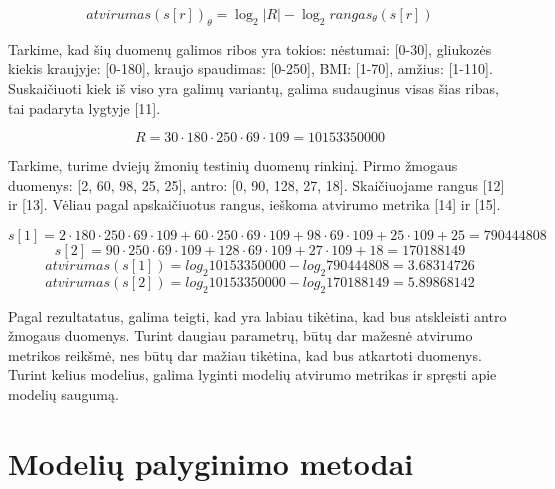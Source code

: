 \documentclass{VUMIFInfBakalaurinis}
\begin{document}
\begin{equation}
atvirumas(s[r])_{\theta} = \log_{2}|R| - \log_{2}rangas_{\theta}(s[r]) 
\end{equation}

\par Tarkime, kad šių duomenų galimos ribos yra tokios: nėstumai: [0-30], gliukozės kiekis kraujyje: [0-180], kraujo spaudimas: [0-250], BMI: [1-70], amžius: [1-110]. Suskaičiuoti kiek iš viso yra galimų variantų, galima sudauginus visas šias ribas, tai padaryta lygtyje [11].

\begin{equation}
R = 30 \cdot 180 \cdot 250 \cdot 69 \cdot 109 = 10153350000
\end{equation}

\par Tarkime, turime dviejų žmonių testinių duomenų rinkinį. Pirmo žmogaus duomenys: [2, 60, 98, 25, 25], antro: [0, 90, 128, 27, 18]. Skaičiuojame rangus [12] ir [13]. Vėliau pagal apskaičiuotus rangus, ieškoma atvirumo metrika [14] ir [15].

\begin{equation}
s[1] = 2 \cdot 180 \cdot 250 \cdot 69 \cdot 109 + 60 \cdot 250 \cdot 69 \cdot 109 + 98 \cdot 69 \cdot 109 + 25 \cdot 109 + 25 = 790444808
\end{equation}
\begin{equation}
s[2] = 90 \cdot 250 \cdot 69 \cdot 109 + 128 \cdot 69 \cdot 109 + 27 \cdot 109 + 18 = 170188149
\end{equation}
\begin{equation}
atvirumas(s[1]) = log_{2} 10153350000 - log_{2} 790444808 = 3.68314726
\end{equation}
\begin{equation}
atvirumas(s[2]) = log_{2} 10153350000 - log_{2} 170188149 = 5.89868142
\end{equation}

\par Pagal rezultatatus, galima teigti, kad yra labiau tikėtina, kad bus atskleisti antro žmogaus duomenys. Turint daugiau parametrų, būtų dar mažesnė atvirumo metrikos reikšmė, nes būtų dar mažiau tikėtina, kad bus atkartoti duomenys. Turint kelius modelius, galima lyginti modelių atvirumo metrikas ir spręsti apie modelių saugumą.

\section{Modelių palyginimo metodai}
\end{document}
